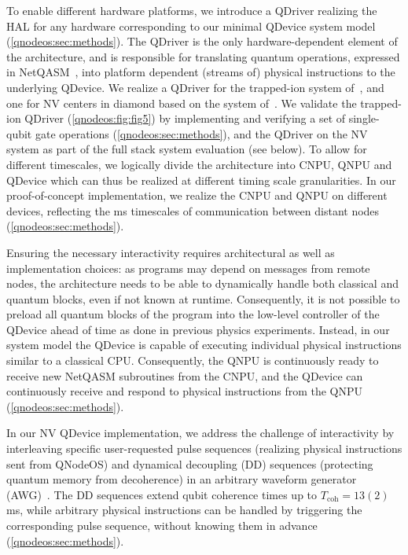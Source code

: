 To enable different hardware platforms, we introduce a QDriver realizing the HAL for any hardware corresponding to our minimal QDevice system model (\cref{qnodeos:sec:methods}).
The QDriver is the only hardware-dependent element of the architecture, and is responsible for translating quantum operations, expressed in NetQASM~\cite{dahlberg_2022_netqasm}, into platform dependent (streams of) physical instructions to the underlying QDevice.
We realize a QDriver for the trapped-ion system of~\cite{teller2023integrating,teller2021heating}, and one for NV centers in diamond based on the system of~\cite{hermans2022qubit,pompili_2021_multinode,pompili_2022_experimental}.
We validate the trapped-ion QDriver (\cref{qnodeos:fig:fig5}) by implementing and verifying a set of single-qubit gate operations (\cref{qnodeos:sec:methods}), and the QDriver on the NV system as part of the full stack system evaluation (see below). 
To allow for different timescales, we logically divide the architecture into CNPU, QNPU and QDevice which can thus be realized at different timing scale granularities.
In our proof-of-concept implementation, we realize the CNPU and QNPU on different devices, reflecting the ms timescales of communication between distant nodes (\cref{qnodeos:sec:methods}).

Ensuring the necessary interactivity requires architectural as well as implementation choices: as programs may depend on messages from remote nodes, the architecture needs to be able to dynamically handle both classical and quantum blocks, even if not known at runtime.
Consequently, it is not possible to preload all quantum blocks of the program into the low-level controller of the QDevice ahead of time as done in previous physics experiments.
Instead, in our system model the QDevice is capable of executing individual physical instructions similar to a classical CPU.
Consequently, the QNPU is continuously ready to receive new NetQASM subroutines from the CNPU, and the QDevice can continuously receive and respond to physical instructions from the QNPU (\cref{qnodeos:sec:methods}).

In our NV QDevice implementation, we address the challenge of interactivity by interleaving specific user-requested pulse sequences (realizing physical instructions sent from QNodeOS) and dynamical decoupling (DD) sequences (protecting quantum memory from decoherence) in an arbitrary waveform generator (AWG)~\cite{zurich_instruments_hdawg_2019}.
The DD sequences extend qubit coherence times up to $T_{\text{coh}} = 13(2)$ ms, while arbitrary physical instructions can be handled by triggering the corresponding pulse sequence, without knowing them in advance (\cref{qnodeos:sec:methods}).

